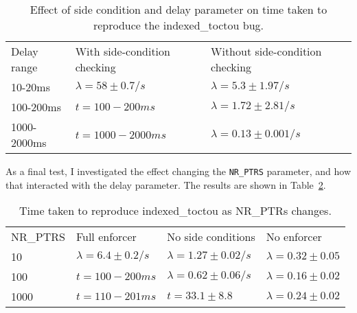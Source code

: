 \begin{table}
\begin{tabular}{lll}
Delay range  & With side-condition checking          & Without side-condition checking \\
10-20ms      & $\lambda = 58 \pm 0.7/s$              & $\lambda = 5.3 \pm 1.97/s$ \\
100-200ms    & $t = 100 - 200ms$                     & $\lambda = 1.72 \pm 2.81/s$ \\
1000-2000ms  & $t = 1000 - 2000ms$                   & $\lambda = 0.13 \pm 0.001/s$ \\
\end{tabular}
\caption{Effect of side condition and delay parameter on time taken to
  reproduce the indexed\_toctou bug.}  
\label{table:eval:indexedtoctou:delay}
\end{table}

As a final test, I investigated the effect changing the \verb|NR_PTRS|
parameter, and how that interacted with the delay parameter.  The
results are shown in Table~\ref{table:eval:indexedtoctou:nrptrs}.



\begin{table}
\begin{tabular}{llll}
NR\_PTRS & Full enforcer             & No side conditions          & No enforcer               \\
10       & $\lambda = 6.4 \pm 0.2/s$ & $\lambda = 1.27 \pm 0.02/s$ & $\lambda = 0.32 \pm 0.05$ \\
100      & $t = 100 - 200ms$         & $\lambda = 0.62 \pm 0.06/s$ & $\lambda = 0.16 \pm 0.02$ \\
1000     & $t = 110 - 201ms$         & $t = 33.1 \pm 8.8$          & $\lambda = 0.24 \pm 0.02$ \\
\end{tabular}
\caption{Time taken to reproduce indexed\_toctou as NR\_PTRs changes.}
\label{table:eval:indexedtoctou:nrptrs}
\end{table}

